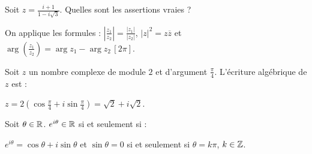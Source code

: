 \begin{question}
 
Soit $z=\frac{i+1}{1-i\sqrt 3}$. Quelles sont les assertions vraies ?
\begin{answers}
    



    
\end{answers}
\begin{explanations}
On applique les formules :
$|\frac{z_1}{z_2}|= \frac{|z_1|}{|z_2|}$, $|z|^2=z\overline{z}$ et $\arg(\frac{z_1}{z_2})= \arg z_1 - \arg z_2 \, [2\pi]$. 
\end{explanations}

\end{question}



\begin{question}

Soit $z$ un nombre complexe de module $2$ et d'argument $\frac{\pi}{4}$. L'écriture algébrique de $z$ est : 
\begin{answers}



\end{answers}
\begin{explanations}
$z=2(\cos\frac{\pi}{4}+i\sin\frac{\pi}{4}) =\sqrt 2+i\sqrt 2 $.
\end{explanations}

\end{question}


\begin{question}

Soit $\theta \in \mathbb{R}$. $e^{i\theta}\in \mathbb{R}$  si et seulement si : 
\begin{answers}

    \bad{ $\theta  =2\pi$}


\end{answers}
\begin{explanations}
$e^{i\theta}= \cos \theta + i \sin \theta $ et $\sin \theta = 0 $ si et seulement si $\theta  =k\pi$, $k \in \mathbb{Z}$.
\end{explanations}

\end{question}


